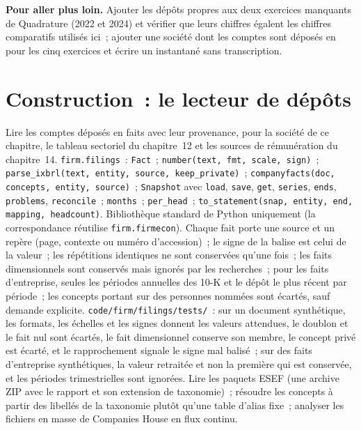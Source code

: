 \textbf{Pour aller plus loin.} Ajouter les dépôts propres aux deux exercices manquants de Quadrature (2022 et 2024) et vérifier que
leurs chiffres égalent les chiffres comparatifs utilisés ici~; ajouter une société dont les comptes sont déposés en  pour les cinq exercices
et écrire un instantané sans transcription.

\section{Construction~: le lecteur de dépôts}\label{bld:in:reading-a-trading-firms-accounts:filings}

\begin{build}
 Lire les comptes déposés en faits avec leur provenance, pour la société de ce chapitre, le tableau sectoriel du chapitre~12
et les sources de rémunération du chapitre~14.
 \texttt{firm.filings}~: \texttt{Fact}~; \texttt{number(text, fmt, scale, sign)}~;
\texttt{parse\_ixbrl(text, entity, source, keep\_private)}~; \texttt{companyfacts(doc, concepts, entity, source)}~;
\texttt{Snapshot} avec \texttt{load}, \texttt{save}, \texttt{get}, \texttt{series}, \texttt{ends}, \texttt{problems},
\texttt{reconcile}~; \texttt{months}~; \texttt{per\_head}~; \texttt{to\_statement(snap, entity, end, mapping, headcount)}.
Bibliothèque standard de Python uniquement (la correspondance réutilise \texttt{firm.firmecon}).
 Chaque fait porte une source et un repère (page, contexte ou numéro d'accession)~; le signe de la balise est celui
de la valeur~; les répétitions identiques ne sont conservées qu'une fois~; les faits dimensionnels sont conservés mais ignorés par les recherches~; pour les faits d'entreprise, seules les périodes annuelles des
10-K et le dépôt le plus récent par période~; les concepts portant sur des personnes nommées sont écartés, sauf demande
explicite.
 \texttt{code/firm/filings/tests/}~: sur un document synthétique, les formats, les échelles et les signes donnent
les valeurs attendues, le doublon et le fait nul sont écartés, le fait dimensionnel conserve son membre, le concept privé
est écarté, et le rapprochement signale le signe mal balisé~; sur des faits d'entreprise synthétiques, la valeur retraitée
et non la première qui est conservée, et les périodes trimestrielles sont ignorées.
 Lire les paquets ESEF (une archive ZIP avec le rapport et son extension de taxonomie)~; résoudre les concepts à partir des libellés de la
taxonomie plutôt qu'une table d'alias fixe~; analyser les fichiers en masse de Companies House en flux continu.
\end{build}

